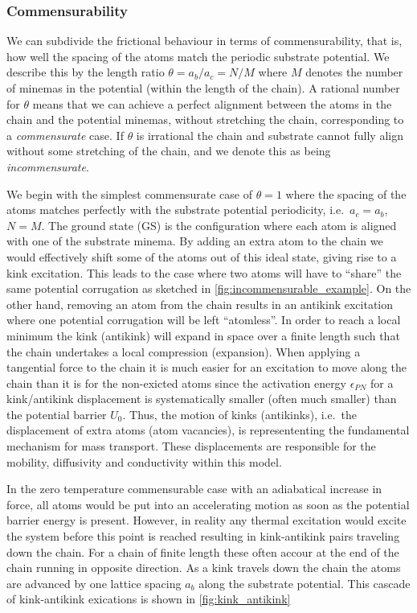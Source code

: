 \subsubsection{Commensurability} We can subdivide the frictional behaviour in terms of commensurability, that is, how well the spacing of the atoms match the periodic substrate potential. We describe this by the length ratio $\theta = a_b / a_c = N / M$ where $M$ denotes the number of minemas in the potential (within the length of the chain). A rational number for $\theta$ means that we can achieve a perfect alignment between the atoms in the chain and the potential minemas, without stretching the chain, corresponding to a \textit{commensurate} case. If $\theta$ is irrational the chain and substrate cannot fully align without some stretching of the chain, and we denote this as being \textit{incommensurate}.

We begin with the simplest commensurate case of $\theta = 1$ where the spacing
of the atoms matches perfectly with the substrate potential periodicity, i.e.\
$a_c = a_b$, $N = M$. The ground state (\acrshort{GS}) is the configuration where each atom
is aligned with one of the substrate minema. By adding an extra atom to the chain we would effectively shift some of the atoms out of this ideal state, giving rise to a kink excitation. This leads to the case where two atoms will have to ``share'' the same potential corrugation as sketched in \cref{fig:incommensurable_example}.  On the
other hand, removing an atom from the chain results in an antikink excitation
where one potential corrugation will be left ``atomless''. In order to reach a
local minimum the kink (antikink) will expand in space over a finite length such
that the chain undertakes a local compression (expansion). When applying a
tangential force to the chain it is much easier for an excitation to move along
the chain than it is for the non-exicted atoms since the activation energy
$\epsilon_{PN}$ for a kink/antikink displacement is systematically smaller
(often much smaller) than the potential barrier $U_0$. Thus, the motion of kinks
(antikinks), i.e.\ the displacement of extra atoms (atom vacancies), is
represententing the fundamental mechanism for mass transport. These
displacements are responsible for the mobility, diffusivity and conductivity
within this model. 

In the zero temperature commensurable case with an adiabatical increase in force, all atoms would be put into an accelerating motion as soon as the potential barrier energy is present. However, in reality any thermal excitation would excite the system before this point is reached resulting in kink-antikink pairs traveling down the chain. For a chain of finite length these often accour at the end of the chain running in opposite direction. As a kink travels down the chain the atoms are advanced by one lattice spacing $a_b$ along the substrate potential. This cascade of kink-antikink exications is shown in \cref{fig:kink_antikink}

